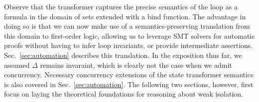 Observe that the transformer captures the precise semantics of the
loop as a formula in the domain of sets extended with a bind
function. The advantage in doing so is that we can now make use of a
semantics-preserving translation from this domain to first-order
logic, allowing us to leverage SMT solvers for automatic proofs
without having to infer loop invariants, or provide intermediate
assertions.  Sec.~\ref{sec:automation} describes this translation. In
the exposition thus far, we assumed $\Delta$ remains invaraint, which
is clearly not the case when we admit concurrency.  Necessary
concurrency extensions of the state transformer semantics is also
covered in Sec.~\ref{sec:automation}.  The following two sections,
however, first focus on laying the theoretical foundations for
reasoning about weak isolation.
